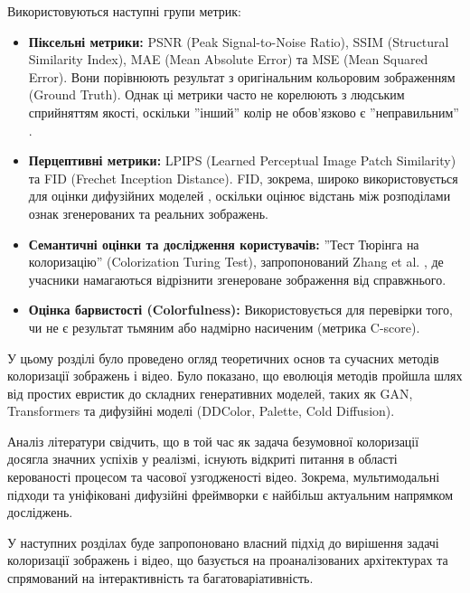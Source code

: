     Використовуються наступні групи метрик:
    \begin{itemize}[label=$\bullet$]
        \item \textbf{Піксельні метрики:} PSNR (Peak Signal-to-Noise Ratio), SSIM (Structural Similarity Index), MAE (Mean Absolute Error) та MSE (Mean Squared Error).
            Вони порівнюють результат з оригінальним кольоровим зображенням (Ground Truth).
            Однак ці метрики часто не корелюють з людським сприйняттям якості, оскільки ''інший'' колір не обов'язково є ''неправильним'' \cite{2016-colorful-image-colorization}.
        \item \textbf{Перцептивні метрики:} LPIPS (Learned Perceptual Image Patch Similarity) та FID (Frechet Inception Distance).
            FID, зокрема, широко використовується для оцінки дифузійних моделей \cite{2023-diffusion-models-survey}, оскільки оцінює відстань між розподілами ознак згенерованих та реальних зображень.
        \item \textbf{Семантичні оцінки та дослідження користувачів:} ''Тест Тюрінга на колоризацію'' (Colorization Turing Test), запропонований Zhang et al. \cite{2016-colorful-image-colorization}, де учасники намагаються відрізнити згенероване зображення від справжнього.
        \item \textbf{Оцінка барвистості (Colorfulness):} Використовується для перевірки того, чи не є результат тьмяним або надмірно насиченим (метрика C-score).
    \end{itemize}

\chapconclude{\ref{chap:review}}

    У цьому розділі було проведено огляд теоретичних основ та сучасних методів колоризації зображень і відео.
    Було показано, що еволюція методів пройшла шлях від простих евристик до складних генеративних моделей, таких як GAN, Transformers та дифузійні моделі (DDColor, Palette, Cold Diffusion).

    Аналіз літератури свідчить, що в той час як задача безумовної колоризації досягла значних успіхів у реалізмі, існують відкриті питання в області керованості процесом та часової узгодженості відео.
    Зокрема, мультимодальні підходи та уніфіковані дифузійні фреймворки є найбільш актуальним напрямком досліджень.

    У наступних розділах буде запропоновано власний підхід до вирішення задачі колоризації зображень і відео, що базується на проаналізованих архітектурах та спрямований на інтерактивність та багатоваріативність.




